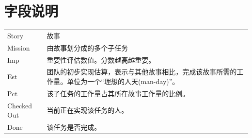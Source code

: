 \documentclass[a4paper]{article}
\begin{document}
\section{字段说明}
\begin{table}[H]
  \centering
  \begin{tabular}{lp{35em}}
    Story & 故事 \\
    Mission & 由故事划分成的多个子任务 \\
    Imp & 重要性评估数值。分数越高越重要。 \\
    Est & 团队的初步实现估算，表示与其他故事相比，完成该故事所需的工作量。单位为一个“理想的人天(man-day)”。 \\
    Pct & 该子任务的工作量占其所在故事工作量的比例。 \\
    Checked Out & 当前正在实现该任务的人。 \\
    Done & 该任务是否完成。 \\
  \end{tabular}
\end{table}
\end{document}
